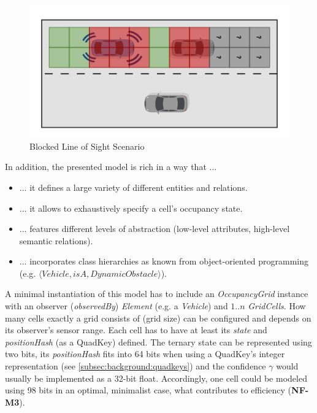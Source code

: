 \begin{figure}[h]
	\centering
	\includegraphics[width=0.7\linewidth]{98_images/unknown_cells_scene}
	\caption{Blocked Line of Sight Scenario}
	\label{fig:blocked_los_scenario}
\end{figure}


In addition, the presented model is rich in a way that ...

\begin{samepage}
	\begin{itemize}
		\item ... it defines a large variety of different entities and relations.
		\item ... it allows to exhaustively specify a cell's occupancy state.
		\item ... features different levels of abstraction (low-level attributes, high-level semantic relations).
		\item ... incorporates class hierarchies as known from object-oriented programming (e.g. $\langle Vehicle, isA, DynamicObstacle \rangle$).
	\end{itemize}
\end{samepage}

A minimal instantiation of this model has to include an \textit{OccupancyGrid} instance with an observer (\textit{observedBy}) \textit{Element} (e.g. a \textit{Vehicle}) and  $1..n$ \textit{GridCells}. How many cells exactly a grid consists of (grid size) can be configured and depends on its observer's sensor range. Each cell has to have at least its \textit{state} and \textit{positionHash} (as a QuadKey) defined. The ternary state can be represented using two bits, its \textit{positionHash} fits into 64 bits when using a QuadKey's integer representation (see \cref{subsec:background:quadkeys}) and the confidence $\gamma$ would usually be implemented as a 32-bit float. Accordingly, one cell could be modeled using 98 bits in an optimal, minimalist case, what contributes to efficiency (\textbf{NF-M3}).

